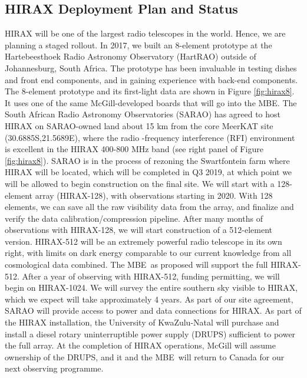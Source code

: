 \documentclass[letterpaper,11pt,preprint]{aastex}
\newcommand{\mbe}{{\rm MBE}}
\begin{document}
\subsection{HIRAX Deployment Plan and Status}

HIRAX will be one of the largest radio telescopes in the world.
Hence, we are planning a staged rollout.  In 2017, we built an
8-element prototype at the Hartebeesthoek Radio Astronomy Observatory
(HartRAO) outside of Johannesburg, South Africa.  The prototype has
been invaluable in testing dishes and front end components, and in
gaining experience with back-end components.  The 8-element prototype
and its first-light data are shown in Figure \ref{fig:hirax8}.  It
uses one of the same McGill-developed boards that will go into the \mbe.
The South African Radio Astronomy Observatories (SARAO) has agreed to
host HIRAX on SARAO-owned land about 15 km from the core MeerKAT site
(30.6885S,21.5689E), where the radio -frequency interference (RFI)
environment is excellent in the HIRAX 400-800 MHz band (see right
panel of Figure \ref{fig:hirax8}). SARAO is in the process of rezoning
the Swartfontein farm where HIRAX will be located, which will be
completed in Q3 2019, at which point we will be allowed to begin
construction on the final site.  We will start with a 128-element
array (HIRAX-128), with observations starting in 2020.  With 128
elements, we can save all the raw visibility data from the array, and
finalize and verify the data calibration/compression pipeline. After
many months of observations with HIRAX-128, we will start construction
of a 512-element version.  HIRAX-512 will be an extremely powerful
radio telescope in its own right, with limits on dark energy
comparable to our current knowledge from all cosmological data
combined.  The \mbe\ as proposed will support the full
HIRAX-512. After a year of observing with HIRAX-512, funding
permitting, we will begin on HIRAX-1024.  We will survey the entire
southern sky visible to HIRAX, which we expect will take approximately
4 years.  As part of our site agreement, SARAO will provide access to
power and data connections for HIRAX.  As part of the HIRAX
installation, the University of KwaZulu-Natal will purchase and
install a diesel rotary uninterruptible power supply (DRUPS)
sufficient to power the full array.  At the completion of HIRAX
operations, McGill will assume ownership of the DRUPS, and it and the
\mbe\ will return to Canada for our next observing programme.
\end{document}
